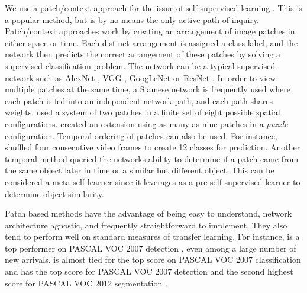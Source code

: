 \documentclass[10pt,twocolumn,letterpaper]{article}
\begin{document}
We use a patch/context approach for the issue of self-supervised learning \cite{Doersch15,Noroozi16a}. This is a popular method, but is by no means the only active path of inquiry. Patch/context approaches work by creating an arrangement of image patches in either space or time. Each distinct arrangement is assigned a class label, and the network then predicts the correct arrangement of these patches by solving a supervised classification problem. The network can be a typical supervised network such as AlexNet \cite{AlexNet}, VGG \cite{VGGNet}, GoogLeNet \cite{GoogLeNet} or ResNet \cite{ResNet}. In order to view multiple patches at the same time, a Siamese network is frequently used where each patch is fed into an independent network path, and each path shares weights. \cite{Doersch15} used a system of two patches in a finite set of eight possible spatial configurations. \cite{Noroozi16a} created an extension using as many as nine patches in a \emph{puzzle} configuration. Temporal ordering of patches can also be used. For instance, \cite{Lee17} shuffled four consecutive video frames to create 12 classes for prediction. Another temporal method \cite{Wang17} queried the networks ability to determine if a patch came from the same object later in time or a similar but different object. This can be considered a meta self-learner since it leverages \cite{Doersch15} as a pre-self-supervised learner to determine object similarity.

Patch based methods have the advantage of being easy to understand, network architecture agnostic, and frequently straightforward to implement. They also tend to perform well on standard measures of transfer learning. For instance, \cite{Doersch15} is a top performer on PASCAL VOC 2007 detection \cite{Girshick15}, even among a large number of new arrivals. \cite{Noroozi16b} is almost tied for the top score on PASCAL VOC 2007 classification \cite{Krahenbuhl16} and has the top score for PASCAL VOC 2007 detection and the second highest score for PASCAL VOC 2012 segmentation \cite{Long15,Pathak16}.
\end{document}
